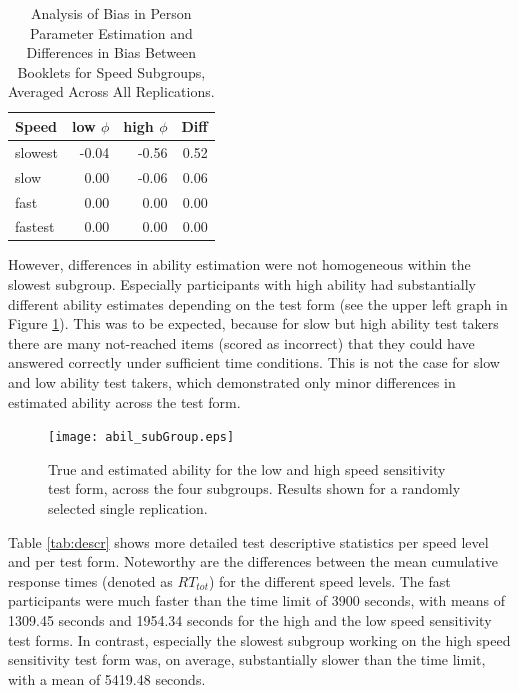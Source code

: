 \documentclass[a4paper,man,apacite,donotrepeattitle]{apa6}
\begin{document}
\begin{table}[ht]
\centering
\caption{Analysis of Bias in Person Parameter Estimation and Differences in Bias Between Booklets for Speed Subgroups, Averaged Across All Replications.} 
\begin{tabular}{lrrr}
  \hline
Speed & low $\phi$ & high $\phi$ & Diff \\ 
  \hline
slowest & -0.04 & -0.56 & 0.52 \\ 
  slow & 0.00 & -0.06 & 0.06 \\ 
  fast & 0.00 & 0.00 & 0.00 \\ 
  fastest & 0.00 & 0.00 & 0.00 \\ 
   \hline
\end{tabular}
\label{tab:bias}
\end{table}

However, differences in ability estimation were not homogeneous within the slowest subgroup. Especially participants with high ability had substantially different ability estimates depending on the test form (see the upper left graph in Figure \ref{fig:abil}). This was to be expected, because for slow but high ability test takers there are many not-reached items (scored as incorrect) that they could have answered correctly under sufficient time conditions. This is not the case for slow and low ability test takers, which demonstrated only minor differences in estimated ability across the test form.

\begin{figure} [!htb]	
	\begin{center}
		\texttt{[image: abil\_subGroup.eps]}
	\end{center}
		\caption{True and estimated ability for the low and high speed sensitivity test form, across the four subgroups. Results shown for a randomly selected single replication.}	
		\label{fig:abil}
\end{figure}

Table \ref{tab:descr} shows more detailed test descriptive statistics per speed level and per test form. Noteworthy are the differences between the mean cumulative response times (denoted as $RT_{tot}$) for the different speed levels. The fast participants were much faster than the time limit of 3900 seconds, with means of 1309.45 seconds and 1954.34 seconds for the high and the low speed sensitivity test forms. In contrast, especially the slowest subgroup working on the high speed sensitivity test form was, on average, substantially slower than the time limit, with a mean of 5419.48 seconds. 
\end{document}
